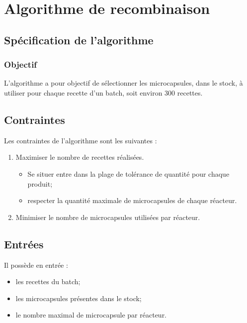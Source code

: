 \section{Algorithme de recombinaison}
\subsection{Spécification de l'algorithme}
\subsubsection*{Objectif}
L'algorithme a pour objectif de sélectionner les \glspl{microcapsule}, dans le stock, à utiliser pour chaque recette d'un batch, soit environ $300$ \glspl{recette}.

\subsection*{Contraintes}
Les contraintes de l'algorithme sont les suivantes : 
\begin{enumerate}
    \item Maximiser le nombre de \glspl{recette} réalisées.
    \begin{itemize}
        \item Se situer entre dans la plage de tolérance de quantité pour chaque produit; 
        \item respecter la quantité maximale de \glspl{microcapsule} de chaque réacteur.
    \end{itemize}    
    \item Minimiser le nombre de \glspl{microcapsule} utilisées par réacteur.
\end{enumerate}
\subsection*{Entrées}
Il possède en entrée : 
\begin{itemize}
    \item les \glspl{recette} du batch;
    \item les \glspl{microcapsule} présentes dans le stock;
    \item le nombre maximal de \gls{microcapsule} par réacteur.
\end{itemize}

